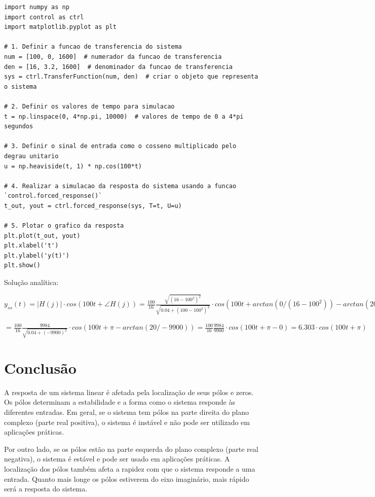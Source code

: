 \documentclass[10pt]{article}
\begin{document}
\begin{lstlisting}
import numpy as np
import control as ctrl
import matplotlib.pyplot as plt

# 1. Definir a funcao de transferencia do sistema
num = [100, 0, 1600]  # numerador da funcao de transferencia
den = [16, 3.2, 1600]  # denominador da funcao de transferencia
sys = ctrl.TransferFunction(num, den)  # criar o objeto que representa o sistema

# 2. Definir os valores de tempo para simulacao
t = np.linspace(0, 4*np.pi, 10000)  # valores de tempo de 0 a 4*pi segundos

# 3. Definir o sinal de entrada como o cosseno multiplicado pelo degrau unitario
u = np.heaviside(t, 1) * np.cos(100*t)

# 4. Realizar a simulacao da resposta do sistema usando a funcao `control.forced_response()`
t_out, yout = ctrl.forced_response(sys, T=t, U=u)

# 5. Plotar o grafico da resposta
plt.plot(t_out, yout)
plt.xlabel('t')
plt.ylabel('y(t)')
plt.show()
\end{lstlisting}

Solução analítica:

$y_{ss}(t) = |H(j)| \cdot cos(100 t + \angle H(j)) = \frac{100}{16} \frac{\sqrt{(16-100^2)^2}}{\sqrt{0.04 + (100 - 100^2)^2}} \cdot cos(100 t + arctan(0/(16 - 100^2)) - arctan(20/(100 - 100^2))) =$

$= \frac{100}{16} \frac{9984}{\sqrt{0.04 + (-9900)^2}} \cdot cos(100 t + \pi - arctan(20/-9900)) = \frac{100}{16} \frac{9984}{9900} \cdot cos(100 t + \pi - 0) = 6.303 \cdot cos(100 t + \pi)$

\newpage

\section{Conclusão}

\quad A resposta de um sistema linear é afetada pela localização de seus pólos e zeros.
Os pólos determinam a estabilidade e a forma como o sistema responde às diferentes entradas.
Em geral, se o sistema tem pólos na parte direita do plano complexo (parte real positiva), o sistema é instável e não pode ser utilizado em aplicações práticas.

\quad Por outro lado, se os pólos estão na parte esquerda do plano complexo (parte real negativa), o sistema é estável e pode ser usado em aplicações práticas.
A localização dos pólos também afeta a rapidez com que o sistema responde a uma entrada.
Quanto mais longe os pólos estiverem do eixo imaginário, mais rápido será a resposta do sistema.
\end{document}

